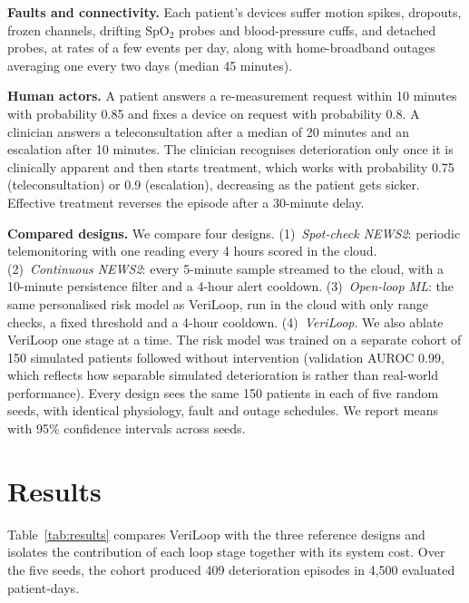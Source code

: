 \documentclass[journal]{IEEEtran}
\begin{document}
\textbf{Faults and connectivity.} Each patient's devices suffer motion spikes, dropouts, frozen channels, drifting
SpO$_2$ probes and blood-pressure cuffs, and detached probes, at rates of a few events per day, along with home-broadband
outages averaging one every two days (median 45 minutes).

\textbf{Human actors.} A patient answers a re-measurement request within 10 minutes with probability 0.85 and fixes a
device on request with probability 0.8. A clinician answers a teleconsultation after a median of 20 minutes and an
escalation after 10 minutes. The clinician recognises deterioration only once it is clinically apparent and then
starts treatment, which works with probability 0.75 (teleconsultation) or 0.9 (escalation), decreasing as the patient
gets sicker. Effective treatment reverses the episode after a 30-minute delay.

\textbf{Compared designs.} We compare four designs. (1)~\emph{Spot-check NEWS2}: periodic telemonitoring with one
reading every 4 hours scored in the cloud. (2)~\emph{Continuous NEWS2}: every 5-minute sample streamed to the cloud,
with a 10-minute persistence filter and a 4-hour alert cooldown. (3)~\emph{Open-loop ML}: the same personalised risk model
as VeriLoop, run in the cloud with only range checks, a fixed threshold and a 4-hour cooldown. (4)~\emph{VeriLoop}.
We also ablate VeriLoop one stage at a time. The risk model was trained on a separate cohort of 150 simulated patients
followed without intervention (validation AUROC 0.99, which reflects how separable simulated deterioration is rather than real-world performance). Every design sees the same 150 patients in each of five
random seeds, with identical physiology, fault and outage schedules. We report means with 95\% confidence intervals
across seeds.

\section*{Results}


Table~\ref{tab:results} compares VeriLoop with the three reference designs and isolates the contribution of each
loop stage together with its system cost. Over the five seeds, the cohort produced 409
deterioration episodes in 4,500 evaluated patient-days.
\end{document}
